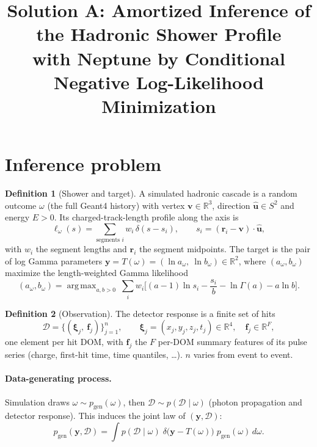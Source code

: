 \documentclass[11pt]{article}
\title{Solution A: Amortized Inference of the Hadronic Shower Profile\\
with Neptune by Conditional Negative Log-Likelihood Minimization}
\author{}
\date{}
\theoremstyle{definition}
\newtheorem{definition}{Definition}
\newcommand{\D}{\mathcal{D}}
\newcommand{\y}{\bm{y}}
\newcommand{\R}{\mathbb{R}}
\DeclareMathOperator*{\argmax}{arg\,max}
\begin{document}
\maketitle

\section{Inference problem}

\begin{definition}[Shower and target]
A simulated hadronic cascade is a random outcome $\omega$ (the full Geant4 history) with
vertex $\bm{v}\in\R^3$, direction $\hat{\bm{u}}\in S^2$ and energy $E>0$. Its charged-track-length
profile along the axis is
\begin{equation}
  \ell_\omega(s) = \sum_{\text{segments } i} w_i\,\delta(s - s_i),
  \qquad s_i = (\bm{r}_i-\bm{v})\cdot\hat{\bm{u}},
\end{equation}
with $w_i$ the segment lengths and $\bm{r}_i$ the segment midpoints. The target is the pair of
log Gamma parameters $\y = T(\omega) = (\ln a_\omega,\ \ln b_\omega)\in\R^2$, where
$(a_\omega,b_\omega)$ maximize the length-weighted Gamma likelihood
\begin{equation}
  (a_\omega,b_\omega) = \argmax_{a,b>0}\ \sum_i w_i\Big[(a-1)\ln s_i - \frac{s_i}{b} - \ln\Gamma(a) - a\ln b\Big].
  \label{eq:label}
\end{equation}
\end{definition}

\begin{definition}[Observation]
The detector response is a finite set of hits
\begin{equation}
  \D = \{(\bm{\xi}_j,\ \bm{f}_j)\}_{j=1}^{n},\qquad
  \bm{\xi}_j = (x_j,y_j,z_j,t_j)\in\R^4,\quad \bm{f}_j\in\R^{F},
\end{equation}
one element per hit DOM, with $\bm{f}_j$ the $F$ per-DOM summary features of its pulse series
(charge, first-hit time, time quantiles, \dots). $n$ varies from event to event.
\end{definition}

\paragraph{Data-generating process.}
Simulation draws $\omega\sim p_{\text{gen}}(\omega)$, then $\D\sim p(\D\mid\omega)$
(photon propagation and detector response). This induces the joint law of $(\y,\D)$:
\begin{equation}
  p_{\text{gen}}(\y,\D) = \int p(\D\mid\omega)\;\delta\big(\y - T(\omega)\big)\;p_{\text{gen}}(\omega)\,d\omega .
\end{equation}
\end{document}
